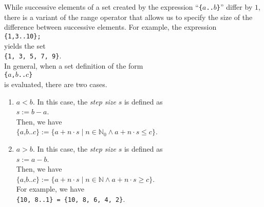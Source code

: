 While successive elements of a set created by the expression ``\texttt{\{$a$..$b$\}}''
differ by $1$, there is a variant of the range operator that allows us to
specify the size of the difference between successive elements.   For example, the expression
\\[0.2cm]
\hspace*{1.3cm}
\texttt{\{1,3..10\};}
\\[0.2cm]
yields the set
\\[0.2cm]
\hspace*{1.3cm}
\texttt{\{1, 3, 5, 7, 9\}}.
\\[0.2cm]
In general, when a set definition of the form
\\[0.2cm]
\hspace*{1.3cm}
\texttt{\{$a$,$b$..$c$\}}
\\[0.2cm]
is evaluated, there are two cases.
\begin{enumerate}
\item $a < b$.  In this case, the \textsl{step size} $s$ is defined as
      \\[0.2cm]
      \hspace*{1.3cm}
      $s := b - a$.
      \\[0.2cm]
      Then, we have
      \\[0.2cm]
      \hspace*{1.3cm}
      $\texttt{\{$a$,$b$..$c$\}} := 
       \{ a + n \cdot s \mid n \in \mathbb{N}_0 \wedge a + n \cdot s \leq c  \}
      $.
\item $a > b$.  In this case, the \textsl{step size} $s$ is defined as
      \\[0.2cm]
      \hspace*{1.3cm}
      $s := a - b$.
      \\[0.2cm]
      Then, we have
      \\[0.2cm]
      \hspace*{1.3cm}
      $\texttt{\{$a$,$b$..$c$\}} := 
       \{ a + n \cdot s \mid n \in \mathbb{N} \wedge a + n \cdot s \geq c  \}
      $.
      \\[0.2cm]
      For example, we have
      \\[0.2cm]
      \hspace*{1.3cm}
      \texttt{\{10, 8..1\} = \{10, 8, 6, 4, 2\}}.
\end{enumerate}

